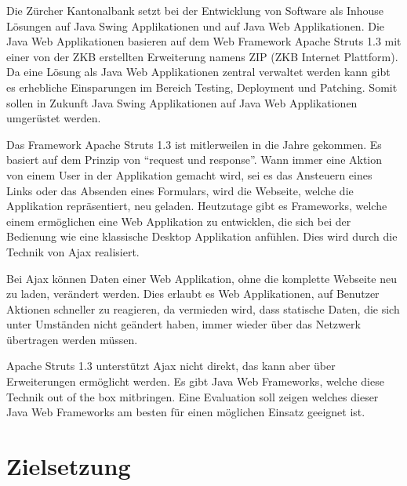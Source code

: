   Die Zürcher Kantonalbank setzt bei der Entwicklung von Software als Inhouse
  Lösungen auf Java Swing Applikationen und auf Java Web Applikationen. Die
  Java Web Applikationen basieren auf dem Web Framework Apache Struts 1.3
  mit einer von der ZKB erstellten Erweiterung namens ZIP (ZKB Internet
  Plattform). Da eine Lösung als Java Web Applikationen zentral verwaltet
  werden kann gibt es erhebliche Einsparungen im Bereich Testing, Deployment
  und Patching. Somit sollen in Zukunft Java Swing Applikationen auf Java Web
  Applikationen umgerüstet werden.
  
  Das Framework Apache Struts 1.3 ist mitlerweilen in die Jahre gekommen. Es
  basiert auf dem Prinzip von ``request und response''. Wann immer eine Aktion
  von einem User in der Applikation gemacht wird, sei es das Ansteuern eines
  Links oder das Absenden eines Formulars, wird die Webseite, welche die
  Applikation repräsentiert, neu geladen. Heutzutage gibt es Frameworks, welche
  einem ermöglichen eine Web Applikation zu entwicklen, die sich bei der
  Bedienung wie eine klassische Desktop Applikation anfühlen. Dies wird durch
  die Technik von \ac{Ajax} realisiert.
  
  Bei \ac{Ajax} können Daten einer Web Applikation, ohne die komplette Webseite
  neu zu laden, verändert werden. Dies erlaubt es Web Applikationen, auf
  Benutzer Aktionen schneller zu reagieren, da vermieden wird, dass statische
  Daten, die sich unter Umständen nicht geändert haben, immer wieder über das
  Netzwerk übertragen werden müssen.
  
  Apache Struts 1.3 unterstützt \ac{Ajax} nicht direkt, das kann aber über
  Erweiterungen ermöglicht werden. Es gibt Java Web Frameworks, welche diese
  Technik out of the box mitbringen. Eine Evaluation soll zeigen welches dieser
  Java Web Frameworks am besten für einen möglichen Einsatz geeignet ist.
  
  \section{Zielsetzung}
  
